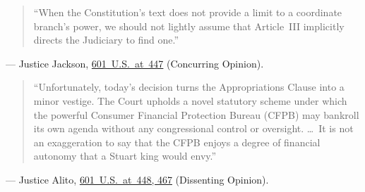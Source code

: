 \documentclass[12pt]{article}
\begin{document}
\begin{quote}
``When the Constitution's text does not provide a limit to a coordinate branch's power, we should not lightly assume that Article~III implicitly directs the Judiciary to find one.''
\end{quote}
\noindent --- Justice Jackson, \href{https://supreme.justia.com/cases/federal/us/601/22-448/}{601~U.S.~at~447} (Concurring Opinion).

\begin{quote}
``Unfortunately, today's decision turns the Appropriations Clause into a minor vestige. The Court upholds a novel statutory scheme under which the powerful Consumer Financial Protection Bureau (CFPB) may bankroll its own agenda without any congressional control or oversight. \ldots\ It is not an exaggeration to say that the CFPB enjoys a degree of financial autonomy that a Stuart king would envy.''
\end{quote}
\noindent --- Justice Alito, \href{https://supreme.justia.com/cases/federal/us/601/22-448/}{601~U.S.~at~448, 467} (Dissenting Opinion).
\end{document}
